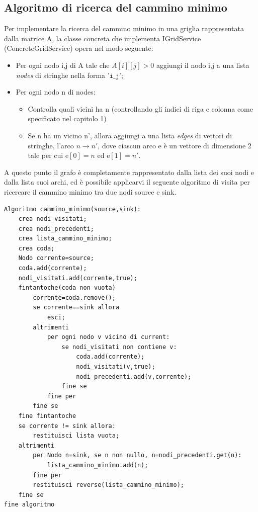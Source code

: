 \subsection{Algoritmo di ricerca del cammino minimo}
Per implementare la ricerca del cammino minimo in una griglia rappresentata dalla matrice A, la classe concreta che implementa IGridService (ConcreteGridService) opera nel modo seguente:
\begin{itemize}
	\item Per ogni nodo i,j di A tale che $A[i][j]>0$ aggiungi il nodo i,j a una lista \emph{nodes} di stringhe nella forma 	'$\texttt{i\_j}$';
	\item Per ogni nodo n di nodes:
	\begin{itemize}
		\item Controlla quali vicini ha n (controllando gli indici di riga e colonna come specificato nel capitolo 1)
		\item Se n ha un vicino n', allora aggiungi a una lista \emph{edges} di vettori di stringhe, l'arco $n\rightarrow n'$, dove ciascun arco e \`e un vettore di dimensione 2 tale per cui e$[0]=n$ ed e$[1]=n'$.
	\end{itemize}
\end{itemize}
A questo punto il grafo \`e completamente rappresentato dalla lista dei suoi nodi e dalla lista suoi archi, ed \`e possibile applicarvi il seguente algoritmo di visita per ricercare il cammino minimo tra due nodi source e sink.
\scriptsize
\begin{lstlisting}
Algoritmo cammino_minimo(source,sink):
	crea nodi_visitati;
	crea nodi_precedenti;
	crea lista_cammino_minimo;
	crea coda;
	Nodo corrente=source;
	coda.add(corrente);
	nodi_visitati.add(corrente,true);
	fintantoche(coda non vuota)
		corrente=coda.remove();
		se corrente==sink allora 
			esci;
		altrimenti
			per ogni nodo v vicino di current:
				se nodi_visitati non contiene v:
					coda.add(corrente);
					nodi_visitati(v,true);
					nodi_precedenti.add(v,corrente);
				fine se
			fine per
		fine se
	fine fintantoche
	se corrente != sink allora:
		restituisci lista vuota;
	altrimenti
		per Nodo n=sink, se n non nullo, n=nodi_precedenti.get(n):
			lista_cammino_minimo.add(n);
		fine per
		restituisci reverse(lista_cammino_minimo);
	fine se
fine algoritmo
\end{lstlisting}
\normalsize
